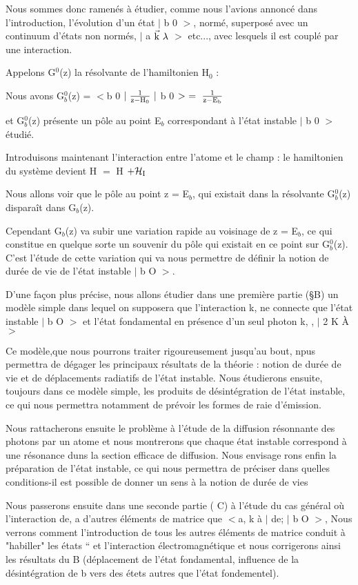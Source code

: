 Nous sommes donc ramenés à étudier, comme nous l'avions annoncé
dans l'introduction, l'évolution d'un état $|$ b 0 $>$, normé, superposé avec un
continuum d'états non normés, $|$ a $\vec{\text{k}}\ \lambda$ $>$ etc..., avec lesquels il est couplé
par une interaction.

Appelons G$^0$(z) la résolvante de l’hamiltonien H$_0$ :

Nous avons G$^0_b$(z) = $<$b 0 $|\ \frac{1}{\text{z}-\text{H}_0}\ |$ b 0 $>\ =\ \frac{1}{\mt{z}-\mt{E}_\mt{b}}$

et G$^0_b$(z) présente un pôle au point E$_b$ correspondant à l'état instable
$|$ b 0 $>$ étudié.

Introduisons maintenant l'interaction entre l'atome et le champ :
le hamiltonien du système devient H $=$ H $+\mathcal{H}_{\text{I}}$

Nous allons voir que le pôle au point z = E$_b$, qui existait dans
la résolvante G$^0_b$(z) disparaît dans G$_b$(z).

Cependant G$_b$(z) va subir une variation rapide au voisinage de
z = E$_b$, ce qui constitue en quelque sorte un souvenir du pôle qui existait
en ce point sur G$^0_b$(z). C'est l'étude de cette variation qui va nous permettre de définir la notion de durée de vie de l'état instable $|$ b O $>$.

D'une façon plus précise, nous allons étudier dans une première
partie (\S B) un modèle simple dans lequel on supposera que l'interaction k,
ne connecte que l'état instable $|$ b O $>$ et l'état fondamental en présence
d'un seul photon k, , $|$ 2 K À $>$

Ce modèle,que nous pourrons traiter rigoureusement jusqu'au bout,
npus permettra de dégager les principaux résultats de la théorie : notion de
durée de vie et de déplacements radiatifs de l’état instable. Nous étudierons
ensuite, toujours dans ce modèle simple, les produits de désintégration de
l'état instable, ce qui nous permettra notamment de prévoir les formes de raie
d'émission.

Nous rattacherons ensuite le problème à l'étude de la diffusion
résonnante des photons par un atome et nous montrerons que chaque état instable
correspond à une résonance duns la section efficace de diffusion. Nous envisage
rons enfin la préparation de l'état instable, ce qui nous permettra de préciser
dans quelles conditions-il est possible de donner un sens à la notion de durée
de vies

Nous passerons ensuite dans une seconde partie ( C) à l'étude
du cas général où l'interaction de, a d'autres éléments de matrice que
$<$a, k à $|$ de; $|$ b O $>$, Nous verrons comment l'introduction de tous les autres éléments de matrice conduit à "habiller" les états “ et l'interaction
électromagnétique et nous corrigerons ainsi les résultats du  B (déplacement
de l'état fondamental, influence de la désintégration de b vers des étets
autres que l'état fondementel).

